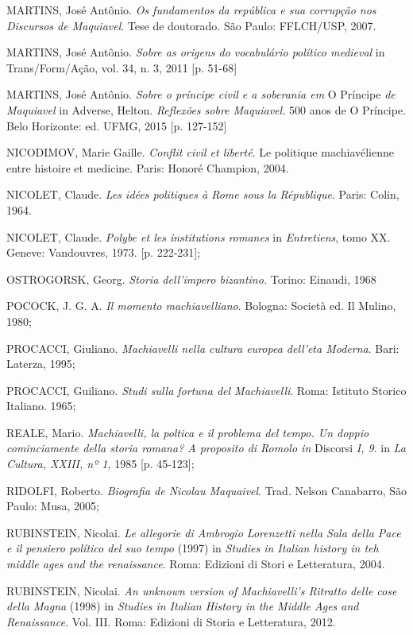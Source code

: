 MARTINS, José Antônio. \emph{Os fundamentos da república e sua corrupção
nos Discursos de Maquiavel}. Tese de doutorado. São Paulo: FFLCH/USP,
2007.

MARTINS, José Antônio. \emph{Sobre as origens do vocabulário político
medieval} in Trans/Form/Ação, vol. 34, n. 3, 2011 {[}p. 51-68{]}

MARTINS, José Antônio. \emph{Sobre o príncipe civil e a soberania em} O
Príncipe \emph{de Maquiavel} in Adverse, Helton. \emph{Reflexões sobre
Maquiavel.} 500 anos de O Príncipe. Belo Horizonte: ed. UFMG, 2015 {[}p.
127-152{]}

NICODIMOV, Marie Gaille. \emph{Conflit civil et liberté}. Le politique
machiavélienne entre histoire et medicine. Paris: Honoré Champion, 2004.

NICOLET, Claude. \emph{Les idées politiques à Rome sous la République}.
Paris: Colin, 1964.

NICOLET, Claude. \emph{Polybe et les institutions romanes} in
\emph{Entretiens}, tomo XX. Geneve: Vandouvres, 1973. {[}p. 222-231{]};

OSTROGORSK, Georg. \emph{Storia dell'impero bizantino.} Torino: Einaudi,
1968

POCOCK, J. G. A. \emph{Il momento machiavelliano}. Bologna: Società ed.
Il Mulino, 1980;

PROCACCI, Giuliano. \emph{Machiavelli nella cultura europea dell'eta
Moderna}. Bari: Laterza, 1995;

PROCACCI, Guiliano. \emph{Studi sulla fortuna del Machiavelli}. Roma:
Istituto Storico Italiano. 1965;

REALE, Mario. \emph{Machiavelli, la poltica e il problema del tempo. Un
doppio cominciamente della storia romana? A proposito di Romolo in}
Discorsi \emph{I, 9}. in \emph{La Cultura, XXIII, nº 1,} 1985 {[}p.
45-123{]};

RIDOLFI, Roberto. \emph{Biografia de Nicolau Maquaivel}. Trad. Nelson
Canabarro, São Paulo: Musa, 2005;

RUBINSTEIN, Nicolai. \emph{Le allegorie di Ambrogio Lorenzetti nella
Sala della Pace e il pensiero político del suo tempo} (1997) in
\emph{Studies in Italian history in teh middle ages and the
renaissance}. Roma: Edizioni di Stori e Letteratura, 2004.

RUBINSTEIN, Nicolai. \emph{An unknown version of Machiavelli's Ritratto
delle cose della Magna} (1998) in \emph{Studies in Italian History in
the Middle Ages and Renaissance.} Vol. III. Roma: Edizioni di Storia e
Letteratura, 2012.

